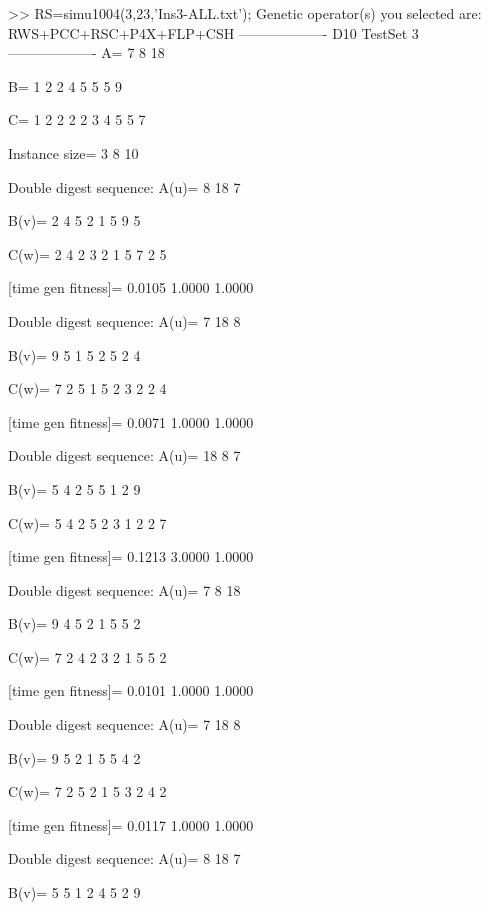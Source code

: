 >> RS=simu1004(3,23,'Ins3-ALL.txt');
Genetic operator(s) you selected are:
RWS+PCC+RSC+P4X+FLP+CSH
------------------- D10 TestSet 3 -------------------
A=
     7     8    18

B=
     1     2     2     4     5     5     5     9

C=
     1     2     2     2     2     3     4     5     5     7

Instance size=
     3     8    10

Double digest sequence:
A(u)=
     8    18     7

B(v)=
     2     4     5     2     1     5     9     5

C(w)=
     2     4     2     3     2     1     5     7     2     5

[time gen fitness]=
    0.0105    1.0000    1.0000

Double digest sequence:
A(u)=
     7    18     8

B(v)=
     9     5     1     5     2     5     2     4

C(w)=
     7     2     5     1     5     2     3     2     2     4

[time gen fitness]=
    0.0071    1.0000    1.0000

Double digest sequence:
A(u)=
    18     8     7

B(v)=
     5     4     2     5     5     1     2     9

C(w)=
     5     4     2     5     2     3     1     2     2     7

[time gen fitness]=
    0.1213    3.0000    1.0000

Double digest sequence:
A(u)=
     7     8    18

B(v)=
     9     4     5     2     1     5     5     2

C(w)=
     7     2     4     2     3     2     1     5     5     2

[time gen fitness]=
    0.0101    1.0000    1.0000

Double digest sequence:
A(u)=
     7    18     8

B(v)=
     9     5     2     1     5     5     4     2

C(w)=
     7     2     5     2     1     5     3     2     4     2

[time gen fitness]=
    0.0117    1.0000    1.0000

Double digest sequence:
A(u)=
     8    18     7

B(v)=
     5     5     1     2     4     5     2     9

